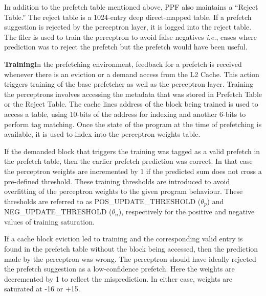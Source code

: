 In addition to the prefetch table mentioned above, PPF also maintains
a ``Reject Table.''  The reject table is a 1024-entry deep
direct-mapped table.  If a prefetch suggestion is rejected by the
perceptron layer, it is logged into the reject table.  The filer is
used to train the perceptron to %
avoid false negatives \textit{i.e.}, cases where prediction was to
reject the prefetch but the prefetch would have been useful.



\textbf{Training}\newline In the prefetching environment, feedback for
a prefetch is received whenever there is an eviction or a demand
access from the L2 Cache.  This action triggers training of the base
prefetcher as well as the perceptron layer.  Training the perceptrons
involves accessing the metadata that was stored in Prefetch Table or
the Reject Table.  The cache lines address of the block being trained
is used to access a table, using 10-bits of the address for indexing
and another 6-bits to perform tag matching.  Once the state of the
program at the time of prefetching is available, it is
used to index into the perceptron weights table.

If the demanded block that triggers the training was tagged as a valid
prefetch in the prefetch table, then the earlier prefetch prediction
was correct.  In that case the perceptron weights are incremented by 1
if the predicted sum does not cross a pre-defined threshold. These
training thresholds are introduced to avoid overfitting of the
perceptron weights to the given program behaviour. These thresholds
are referred to as POS\_UPDATE\_THRESHOLD ($\theta_p$) and
NEG\_UPDATE\_THRESHOLD ($\theta_n$), respectively for the positive and
negative values of training saturation.

If a cache block eviction led to training and the corresponding valid
entry is found in the prefetch table without the block being accessed,
then the prediction made by the perceptron was wrong.  The perceptron
should have ideally rejected the prefetch suggestion as a
low-confidence prefetch.  Here the weights are decremented by 1 to
reflect the misprediction. In either case, weights are saturated at
-16 or +15. %

